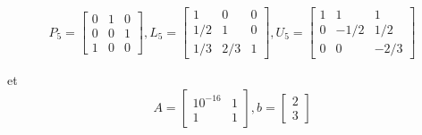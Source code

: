 \documentclass[12pt]{article}
\makeatletter
\theoremstyle{homework}
\newenvironment{exercise}[1]
{\def\@currentlabel{#1}\exercisecore}
{\endexercisecore}
\makeatother
\begin{document}
$$P_5=\begin{bmatrix}
0 & 1 & 0\\
0 & 0 & 1\\
1 & 0 & 0
\end{bmatrix},
L_5=\begin{bmatrix}
1 & 0 & 0\\
1/2 & 1 & 0\\
1/3 & 2/3 & 1
\end{bmatrix},
U_5=\begin{bmatrix}
1 & 1 & 1\\
0 & -1/2 & 1/2\\
0 & 0 & -2/3
\end{bmatrix}$$

\begin{exercise}

Let $$A=\begin{bmatrix}
10^{-16} & 1\\
1 & 1
\end{bmatrix},
b=\begin{bmatrix}
2\\
3
\end{bmatrix}$$
\end{exercise}
\end{document}
